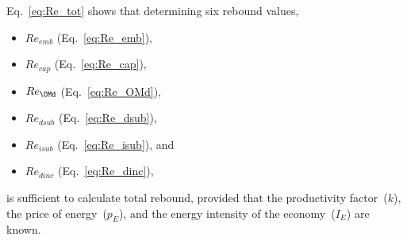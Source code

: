 Eq.~\ref{eq:Re_tot} shows that determining six rebound values,
%
\begin{itemize}

  \item $Re_{emb}$ (Eq.~\ref{eq:Re_emb}), 

  \item $Re_{cap}$ (Eq.~\ref{eq:Re_cap}), 
  
  \item $Re_{\OMd}$ (Eq.~\ref{eq:Re_OMd}),
  
  \item $Re_{dsub}$ (Eq.~\ref{eq:Re_dsub}),
  
  \item $Re_{isub}$ (Eq.~\ref{eq:Re_isub}), and
  
  \item $Re_{dinc}$ (Eq.~\ref{eq:Re_dinc}),

\end{itemize}
%
is sufficient to calculate total rebound, 
provided that 
the productivity factor~($k$),
the price of energy~($p_E$), and
the energy intensity of the economy~($I_E$) 
are known.
